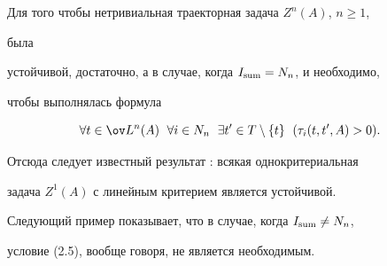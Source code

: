  


\begin{cors} 


Для того чтобы нетривиальная траекторная задача $Z^n(A)$, $n\ge 1$, 


была 


устойчивой, достаточно, а в случае, когда $I_{\operatorname{sum}}=N_n$, и необходимо, 


чтобы выполнялась формула 


\begin{equation} 


\forall t\in\ov L^n(A)\ \;\forall i\in N_n\ \;\exists 


t'\in T\setminus\{t\}\ \;(\tau_i(t,t',A)>0). 


\end{equation} 


 


Отсюда следует известный результат \cite{5}: всякая однокритериальная 


задача $Z^1(A)$ с линейным критерием является устойчивой. 


\end{cors} 


 


Следующий пример показывает, что в случае, когда $I_{\operatorname{sum}}\ne N_n$, 


условие (2.5), вообще говоря, не является необходимым. 


 


